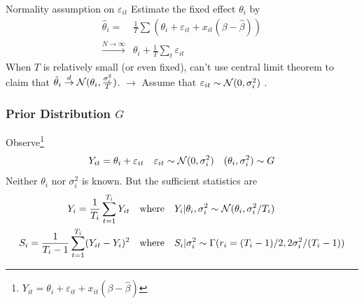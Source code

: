 \documentclass[10pt,mathserif,aspectratio=169]{beamer}
\begin{document}
\begin{frame}{Normality assumption on $\varepsilon_{it}$}
  Estimate the fixed effect $\theta_i$ by
  \begin{align*}
    \hat{\theta}_i =                       & \frac{1}{T}\sum(\theta_i+\varepsilon_{it}+x_{it}(\beta-\hat{\beta})) \\
    \overset{N\to \infty}{\longrightarrow} & \theta_i+\frac{1}{T}\sum_t \varepsilon_{it}
  \end{align*}
  When $T$ is relatively small (or even fixed), can't use central limit theorem to claim that $\hat{\theta}_i \overset{d}{\to} \mathcal{N}(\theta_i,\frac{\sigma_i^2}{T})$.
  $\longrightarrow$ Assume that $\varepsilon_{it} \sim \mathcal{N}(0,\sigma_i^2)$ .
  \hyperlink{observation}{}   \hyperlink{limitation}{}
\end{frame}

\begin{frame}[label=observation]
  \frametitle{Prior Distribution $G$}
  Observe\footnote{$Y_{it}=\theta_i+\varepsilon_{it}+x_{it}(\beta-\hat{\beta})$}
  \begin{equation*}
    Y_{it} = \theta_i + \varepsilon_{it} \quad \varepsilon_{it} \sim \mathcal{N}(0,\sigma_i^2) \quad (\theta_i,\sigma_i^2) \sim G
  \end{equation*}
  Neither $\theta_i$ nor $\sigma_i^2$ is known. But the sufficient statistics are
  \begin{align*}
    Y_i=\frac{1}{T_i}\sum_{t=1}^{T_i}Y_{it}           & \quad \text{where}\quad Y_i|\theta_i,\sigma_i^2 \sim \mathcal{N}(\theta_i,\sigma_i^2/T_i)     \\
    S_i=\frac{1}{T_i-1}\sum_{t=1}^{T_i}(Y_{it}-Y_i)^2 & \quad \text{where} \quad S_i|\sigma_i^2 \sim \Gamma(r_i= (T_i-1)/2,2\sigma_i^2/(T_i-1))
  \end{align*}
  \hyperlink{normality}{}
\end{frame}
\end{document}
